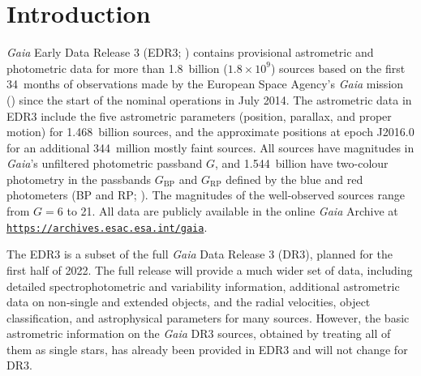 \documentclass[longauth]{aa} %
\begin{document}


   \maketitle
   

%


\section{Introduction} 
\label{sec:intro}

\textit{Gaia} Early Data Release 3 (EDR3; ) contains provisional 
astrometric and photometric data for more than 1.8~billion ($1.8\times 10^9$) sources
based on the first 34~months of observations made by the European Space Agency's 
\textit{Gaia} mission () since the start of the nominal 
operations in July 2014. The astrometric data in EDR3 include the five astrometric 
parameters (position, parallax, and proper motion) for 1.468~billion sources, and the 
approximate positions at epoch J2016.0 for an additional 344~million mostly faint 
sources. All sources have magnitudes in \textit{Gaia}'s unfiltered photometric 
passband $G$, and 1.544~billion have two-colour photometry in the passbands 
$G_\text{BP}$ and $G_\text{RP}$ defined by the blue and red photometers 
(BP and RP; \citealt{EDR3-DPACP-117}). The magnitudes of the well-observed sources range 
from $G=6$ to 21. All data are publicly available in the online \textit{Gaia} Archive at 
\href{https://archives.esac.esa.int/gaia}{\tt https://archives.esac.esa.int/gaia}.

The EDR3 is a subset of the full \textit{Gaia} Data Release 3 (DR3), planned for the 
first half of 2022. The full release will provide a much wider set of data, including
detailed spectrophotometric and variability information, additional astrometric 
data on non-single and extended objects, and the radial velocities, object classification, 
and astrophysical parameters for many sources. However, the basic astrometric 
information on the \textit{Gaia} DR3 sources, obtained by treating all of them as 
single stars, has already been provided in EDR3 and will not change for DR3.
  
\end{document}
